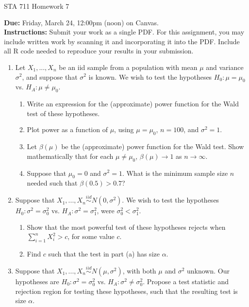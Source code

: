 \documentclass[11pt]{article}
\begin{document}
\begin{center}
\Large
STA 711 Homework 7\\
\normalsize
\vspace{5mm}
\end{center}

\noindent \textbf{Due:} Friday, March 24, 12:00pm (noon) on Canvas.\\ 

\noindent \textbf{Instructions:} Submit your work as a single PDF. For this assignment, you may include written work by scanning it and incorporating it into the PDF. Include all R code needed to reproduce your results in your submission.


\begin{enumerate}
\item Let $X_1,...,X_n$ be an iid sample from a population with mean $\mu$ and variance $\sigma^2$, and suppose that $\sigma^2$ is known. We wish to test the hypotheses $H_0: \mu = \mu_0$ vs. $H_A: \mu \neq \mu_0$.

\begin{enumerate}
\item Write an expression for the (approximate) power function for the Wald test of these hypotheses.
\item Plot power as a function of $\mu$, using $\mu = \mu_0$, $n = 100$, and $\sigma^2 = 1$.
\item Let $\beta(\mu)$ be the (approximate) power function for the Wald test. Show mathematically that for each $\mu \neq \mu_0$, $\beta(\mu) \to 1$ as $n \to \infty$.
\item Suppose that $\mu_0 = 0$ and $\sigma^2 = 1$. What is the minimum sample size $n$ needed such that $\beta(0.5) > 0.7$?
\end{enumerate}

\item Suppose that $X_1,...,X_n \overset{iid}{\sim} N(0, \sigma^2)$. We wish to test the hypotheses $H_0: \sigma^2 = \sigma_0^2$ vs. $H_A: \sigma^2 = \sigma_1^2$, were $\sigma_0^2 < \sigma_1^2$.

\begin{enumerate}
\item Show that the most powerful test of these hypotheses rejects when $\sum \limits_{i=1}^n X_i^2 > c$, for some value $c$.
\item Find $c$ such that the test in part (a) has size $\alpha$.
\end{enumerate}

\item Suppose that $X_1,...,X_n \overset{iid}{\sim} N(\mu, \sigma^2)$, with both $\mu$ and $\sigma^2$ unknown. Our hypotheses are $H_0: \sigma^2 = \sigma_0^2$ vs. $H_A: \sigma^2 \neq \sigma_0^2$. Propose a test statistic and rejection region for testing these hypotheses, such that the resulting test is size $\alpha$.


\end{enumerate}
\end{document}
